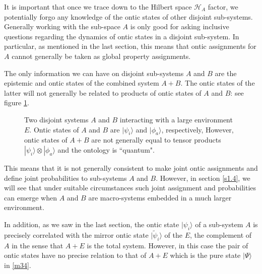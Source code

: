 \documentclass[%
preprint,
nofootinbib,
 amsmath,amssymb,
aps,
]{revtex4-1}
\def\BH{{\mathscr H}}
\def\ket#1{| #1\rangle}
\begin{document}
It is important that once we trace down to the Hilbert space $\BH_A$ factor, we potentially forgo any knowledge of the ontic states of other disjoint sub-systems. Generally working with the sub-space $A$ is only good for asking inclusive questions regarding the dynamics of ontic states in a disjoint sub-system. In particular, as mentioned in the last section, this means that ontic assignments for $A$ cannot generally be taken as global property assignments. 

The only information we can have on disjoint sub-systems $A$ and $B$ are the epistemic and ontic states of the combined system $A+B$. The ontic states of the latter will not generally be related to products of ontic states of $A$ and $B$: see figure \ref{f2}. 
\begin{figure}[ht]
\begin{center}
\end{center}
\caption{\small Two disjoint systems $A$ and $B$ interacting with a large environment $E$. Ontic states of $A$ and $B$ are $\ket{\psi_i}$ and $\ket{\phi_a}$, respectively, However, ontic states of $A+B$ are not generally equal to tensor products $\ket{\psi_i}\otimes\ket{\phi_a}$ and the ontology is ``quantum".}
\label{f2}
\end{figure}
This means that it is not generally consistent to make joint ontic assignments and define joint probabilities to sub-systems $A$ and $B$. However, in section \ref{s1.4}, we will see that under suitable circumstances such joint assignment and probabilities can emerge when $A$ and $B$ are macro-systems embedded in a much larger environment.

In addition, as we saw in the last section, the ontic state $\ket{\psi_i}$ of a sub-system $A$  is precisely correlated with the mirror ontic state $\ket{\tilde\psi_i}$ of the $E$, the complement of $A$ in the sense that $A+E$ is the total system. However, in this case the pair of ontic states have no precise relation to that of $A+E$ which is the pure state $\ket{\Psi}$ in \eqref{m34}.
\end{document}
